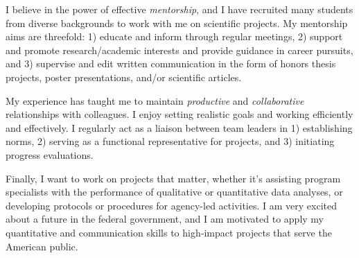 \documentclass[11pt, a4paper]{maedbh-cv}
\begin{document}
\begin{cvletter}
	I believe in the power of effective \textit{mentorship}, and I have recruited many students from diverse backgrounds to work with me on scientific projects. My mentorship aims are threefold: 1) educate and inform through regular meetings, 2) support and promote research/academic interests and provide guidance in career pursuits, and 3) supervise and edit written communication in the form of honors thesis projects, poster presentations, and/or scientific articles. 

	My experience has taught me to maintain \textit{productive} and \textit{collaborative} relationships with colleagues. I enjoy setting realistic goals and working efficiently and effectively. I regularly act as a liaison between team leaders in 1) establishing norms, 2) serving as a functional representative for projects, and 3) initiating progress evaluations. 

	Finally, I want to work on projects that matter, whether it's assisting program specialists with the performance of qualitative or quantitative data analyses, or developing protocols or procedures for agency-led activities. I am very excited about a future in the federal government, and I am motivated to apply my quantitative and communication skills to high‐impact projects that serve the American public. 




\end{cvletter}


\makeletterclosing
\end{document}

